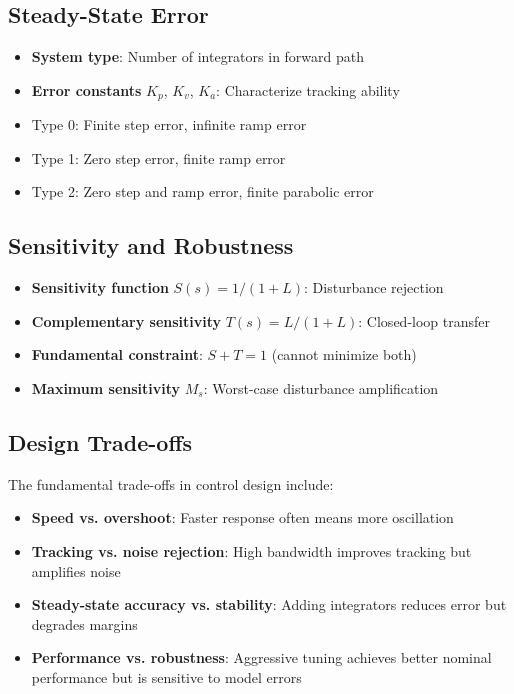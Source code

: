 \subsection{Steady-State Error}

\begin{itemize}
    \item \textbf{System type}: Number of integrators in forward path
    \item \textbf{Error constants} $K_p$, $K_v$, $K_a$: Characterize tracking ability
    \item Type 0: Finite step error, infinite ramp error
    \item Type 1: Zero step error, finite ramp error
    \item Type 2: Zero step and ramp error, finite parabolic error
\end{itemize}

\subsection{Sensitivity and Robustness}

\begin{itemize}
    \item \textbf{Sensitivity function} $S(s) = 1/(1+L)$: Disturbance rejection
    \item \textbf{Complementary sensitivity} $T(s) = L/(1+L)$: Closed-loop transfer
    \item \textbf{Fundamental constraint}: $S + T = 1$ (cannot minimize both)
    \item \textbf{Maximum sensitivity} $M_s$: Worst-case disturbance amplification
\end{itemize}

\subsection{Design Trade-offs}

The fundamental trade-offs in control design include:
\begin{itemize}
    \item \textbf{Speed vs. overshoot}: Faster response often means more oscillation
    \item \textbf{Tracking vs. noise rejection}: High bandwidth improves tracking but amplifies noise
    \item \textbf{Steady-state accuracy vs. stability}: Adding integrators reduces error but degrades margins
    \item \textbf{Performance vs. robustness}: Aggressive tuning achieves better nominal performance but is sensitive to model errors
\end{itemize}

